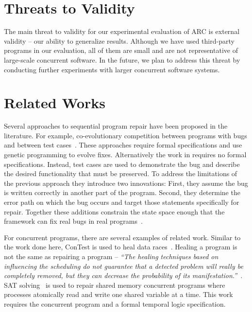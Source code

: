 \documentclass{llncs}
\begin{document}
\section{Threats to Validity}
\label{sec:threats}

The main threat to validity for our experimental evaluation of ARC is external validity -- our ability to generalize results. Although we have used third-party programs in our evaluation, all of them are small and are not representative of large-scale concurrent software. In the future, we plan to address this threat by conducting further experiments with larger concurrent software systems.

\section{Related Works}
\label{sec:related_works}

Several approaches to sequential program repair have been proposed in the literature. For example, co-evolutionary competition between programs with bugs and between test cases~\cite{AY08, Arc08, WT10}. These approaches require formal specifications and use genetic programming to evolve fixes. Alternatively the work in requires no formal specifications. Instead, test cases are used to demonstrate the bug and describe the desired functionality that must be preserved. To address the limitations of the previous approach they introduce two innovations: First, they assume the bug is written correctly in another part of the program. Second, they determine the error path on which the bug occurs and target those statements specifically for repair. Together these additions constrain the state space enough that the framework can fix real bugs in real programs~\cite{FNWG09, WNLF09, NWLF09, WFGN10, GNFW11, LDFW12}.

For concurrent programs, there are several examples of related work. Similar to the work done here, ConTest is used to heal data races~\cite{KLT+07, LVK08}. Healing a program is not the same as repairing a program -- \textit{``The healing techniques based on influencing the scheduling do not guarantee that a detected problem will really be completely removed, but they can decrease the probability of its manifestation.''}~\cite{LVK08}. SAT solving~\cite{AY07}  is used to repair shared memory concurrent programs where processes atomically read and write one shared variable at a time. This work requires the concurrent program and a formal temporal logic specification. 
\end{document}
